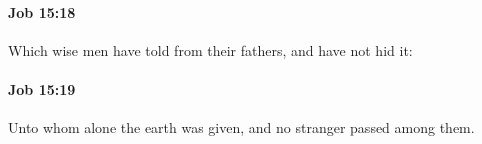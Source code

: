 		\paragraph{Job 15:18} %
			\label{JOB-15-18}

			Which wise men have told from their fathers, and have not hid it:


		\paragraph{Job 15:19} %
			\label{JOB-15-19}

			Unto whom alone the earth was given, and no stranger passed among them.


